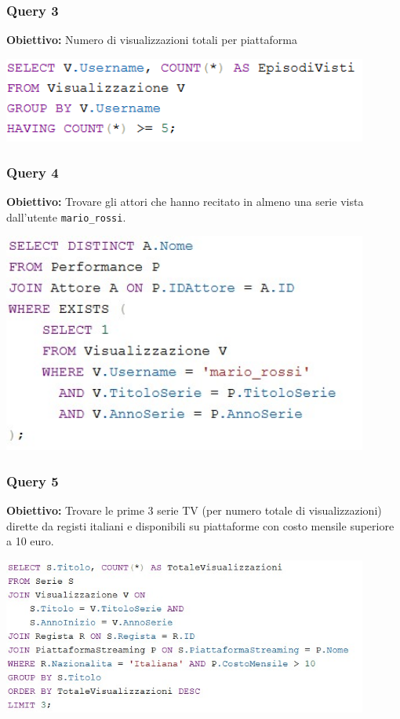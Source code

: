 \documentclass[12pt,a4paper]{article}
\begin{document}
\vspace{1cm}

\subsubsection*{Query 3}
\textbf{Obiettivo:} Numero di visualizzazioni totali per piattaforma

\vspace{0.5cm}
\begin{center}
\includegraphics[width=0.9\textwidth]{Query3.png}
\end{center}

\vspace{1cm}

\subsubsection*{Query 4}
\textbf{Obiettivo:} Trovare gli attori che hanno recitato in almeno una serie vista dall’utente \texttt{mario\_rossi}.

\vspace{0.5cm}
\begin{center}
\includegraphics[width=0.9\textwidth]{Query4.jpg}
\end{center}

\vspace{1cm}

\subsubsection*{Query 5}
\textbf{Obiettivo:} Trovare le prime 3 serie TV (per numero totale di visualizzazioni) dirette da registi italiani e disponibili su piattaforme con costo mensile superiore a 10 euro.

\vspace{0.5cm}
\begin{center}
\includegraphics[width=0.9\textwidth]{Query5.jpg}
\end{center}

\vspace{1cm}
\end{document}
